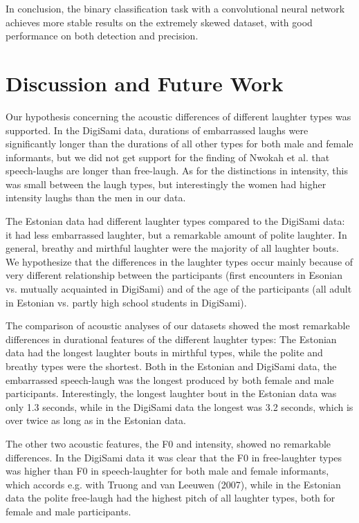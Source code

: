 \documentclass[10pt,journal,compsoc]{IEEEtran}
\begin{document}
In conclusion, the binary classification task with a convolutional neural network achieves more stable results on the extremely skewed dataset, with good performance on both detection and precision.


\section{Discussion and Future Work}
\label{sec:discussion}

Our hypothesis concerning the acoustic differences of different laughter types was supported. In the DigiSami data,  durations of embarrassed laughs were significantly longer than the durations of all other types for both male and female informants, but we did not get support for the finding of Nwokah et al. \cite{Nwokah:ea:99} that speech-laughs are longer than free-laugh. As for the distinctions in intensity, this was small between the laugh types, but interestingly the women had higher intensity laughs than the men in our data.

The Estonian data had different laughter types compared to the DigiSami data: it had less embarrassed laughter, but a remarkable amount of polite laughter. In general, breathy and mirthful laughter were the majority of all laughter bouts. We hypothesize that the differences in the laughter types occur mainly because of very different relationship between the participants (first encounters in Esonian vs. mutually acquainted in DigiSami) and of the age of the participants (all adult in Estonian vs. partly high school students in DigiSami).

The comparison of acoustic analyses of our datasets showed the most remarkable differences in durational features of the different laughter types:  The Estonian data had the longest laughter bouts in mirthful types, while the polite and breathy types were the shortest. Both in the Estonian and DigiSami data, the embarrassed speech-laugh was the longest produced by both female and male participants. Interestingly, the longest laughter bout in the Estonian data was only 1.3 seconds, while in the DigiSami data the longest was 3.2 seconds, which is over twice as long as in the Estonian data.

The other two acoustic features, the F0 and intensity, showed no remarkable differences. In the DigiSami data it was clear that the F0 in free-laughter types was higher than F0 in speech-laughter for both male and female informants, which accords e.g. with Truong and van Leeuwen (2007), while in the Estonian data the polite free-laugh had the highest pitch of all laughter types, both for female and male participants.
\end{document}
